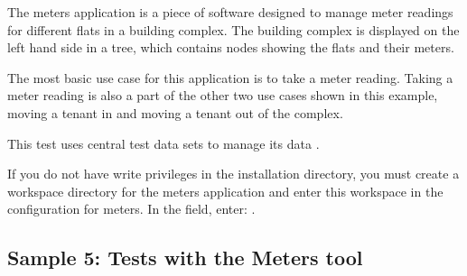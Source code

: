 The meters application is a piece of software designed to manage meter readings for different flats in a building complex. The building complex is displayed on the left hand side in a tree, which contains nodes showing the flats and their meters. 

The most basic use case for this application is to take a meter reading. Taking a meter reading is also a part of the other two use cases shown in this example, moving a tenant in and moving a tenant out of the complex. 

This test uses central test data sets to manage its data . 

If you do not have write privileges in the installation directory, you must create a workspace directory for the meters application and enter this workspace in the \gdaut{} configuration for meters. In the  field, enter: .



\subsection{Sample 5: Tests with the Meters tool}




